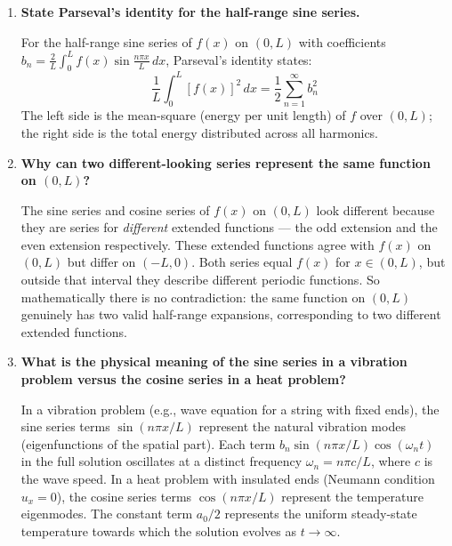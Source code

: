 \documentclass[12pt,a4paper]{article}
\begin{document}
\begin{enumerate}[leftmargin=*, label=\textbf{Q\arabic*.}]
A vibrating string with both ends fixed satisfies $f(0)=0$ and $f(L)=0$. These are the boundary conditions for the sine series: $\sin(n\pi\cdot 0/L) = 0$ and $\sin(n\pi\cdot L/L) = \sin(n\pi) = 0$ for all integers $n$. Therefore, the half-range \textbf{sine series} is the correct representation. Using a cosine series would fail to satisfy $f(0)=0$ since $\cos(0) = 1 \neq 0$.

\item \textbf{State Parseval's identity for the half-range sine series.}

For the half-range sine series of $f(x)$ on $(0,L)$ with coefficients $b_n = \frac{2}{L}\int_0^L f(x)\sin\frac{n\pi x}{L}\,dx$, Parseval's identity states:
\[
  \frac{1}{L}\int_0^L [f(x)]^2\,dx = \frac{1}{2}\sum_{n=1}^{\infty} b_n^2
\]
The left side is the mean-square (energy per unit length) of $f$ over $(0,L)$; the right side is the total energy distributed across all harmonics.

\item \textbf{Why can two different-looking series represent the same function on $(0,L)$?}

The sine series and cosine series of $f(x)$ on $(0,L)$ look different because they are series for \emph{different} extended functions --- the odd extension and the even extension respectively. These extended functions agree with $f(x)$ on $(0,L)$ but differ on $(-L,0)$. Both series equal $f(x)$ for $x\in(0,L)$, but outside that interval they describe different periodic functions. So mathematically there is no contradiction: the same function on $(0,L)$ genuinely has two valid half-range expansions, corresponding to two different extended functions.

\item \textbf{What is the physical meaning of the sine series in a vibration problem versus the cosine series in a heat problem?}

In a vibration problem (e.g., wave equation for a string with fixed ends), the sine series terms $\sin(n\pi x/L)$ represent the natural vibration modes (eigenfunctions of the spatial part). Each term $b_n\sin(n\pi x/L)\cos(\omega_n t)$ in the full solution oscillates at a distinct frequency $\omega_n = n\pi c/L$, where $c$ is the wave speed. In a heat problem with insulated ends (Neumann condition $u_x=0$), the cosine series terms $\cos(n\pi x/L)$ represent the temperature eigenmodes. The constant term $a_0/2$ represents the uniform steady-state temperature towards which the solution evolves as $t\to\infty$.

\end{enumerate}
\end{document}
